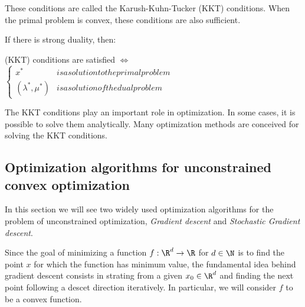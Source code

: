 \documentclass{../cs-classes/cs-classes}
\begin{document}
These conditions are called the Karush-Kuhn-Tucker (KKT) conditions. When the primal problem is convex, these conditions are also sufficient.

\begin{theorem}
    If there is strong duality, then:
    \begin{center}
        (KKT) conditions are satisfied $\iff$ $\begin{cases*}
            x^* &is a solution to the primal problem\\
            (\lambda^*, \mu^*) & is a solution of the dual problem
        \end{cases*}$
    \end{center}
\end{theorem}

The KKT conditions play an important role in optimization. In some cases, it is possible to solve them analytically. Many optimization methods are conceived for solving the KKT conditions.

\subsection{Optimization algorithms for unconstrained convex optimization}
In this section we will see two widely used optimization algorithms for the problem of unconstrained optimization, \emph{Gradient descent} and \emph{Stochastic Gradient descent}.

Since the goal of minimizing a function $f:\R^d\to\R$ for $d\in\N$ is to find the point $x$ for which the function has minimum value, the fundamental idea behind gradient descent consists in strating from a given $x_0\in\R^d$ and finding the next point following a descet direction iteratively. In particular, we will consider $f$ to be a convex function.
\end{document}

